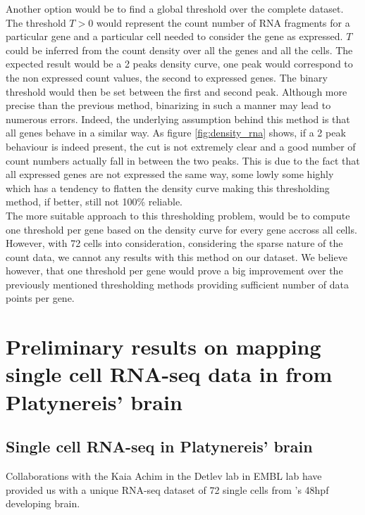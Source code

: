   Another option would be to find a global threshold over the complete dataset. The threshold $T>0$ would represent the count number of RNA fragments for a particular gene and a particular cell needed to consider the gene as expressed. $T$ could be inferred from the count density over all the genes and all the cells. The expected result would be a 2 peaks density curve, one peak would correspond to the non expressed count values, the second to expressed genes. The binary threshold would then be set between the first and second peak. Although more precise than the previous method, binarizing in such a manner may lead to numerous errors. Indeed, the underlying assumption behind this method is that all genes behave in a similar way. As figure \ref{fig:density_rna} shows, if a 2 peak behaviour is indeed present, the cut is not extremely clear and a good number of count numbers actually fall in between the two peaks. This is due to the fact that all expressed genes are not expressed the same way, some lowly some highly which has a tendency to flatten the density curve making this thresholding method, if better, still not 100\% reliable.\\
  
  The more suitable approach to this thresholding problem, would be to compute one threshold per gene based on the density curve for every gene accross all cells. However, with 72 cells into consideration, considering the sparse nature of the count data, we cannot any results with this method on our dataset. We believe however, that one threshold per gene would prove a big improvement over the previously mentioned thresholding methods providing sufficient number of data points per gene.

\section{Preliminary results on mapping single cell RNA-seq data in from Platynereis' brain}\label{sec:back_mapping_platy}
  \subsection{Single cell RNA-seq in Platynereis' brain}
  
    	Collaborations with the Kaia Achim in the Detlev lab in EMBL lab have provided us with a unique RNA-seq dataset of 72 single cells from \platy{}'s 48hpf developing brain. 
    	
